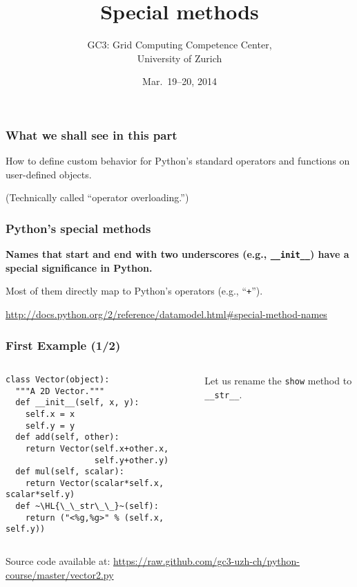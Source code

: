 \documentclass[english,serif,mathserif,xcolor=pdftex,dvipsnames,table]{beamer}
\title[Special methods]{%
  Special methods
}
\author[GC3]{%
  GC3: Grid Computing Competence Center, \\
  University of Zurich
}
\date{Mar.~19--20, 2014}
\begin{document}
\maketitle


\begin{frame}
  \frametitle{What we shall see in this part}

  How to define custom behavior for Python's standard operators and
  functions on user-defined objects.

  \+
  (Technically called ``operator overloading.'')
\end{frame}


\begin{frame}[fragile]
  \frametitle{Python's special methods}

  \textbf{Names that start and end with two underscores (e.g.,
    \lstinline|__init__|) have a special significance in Python.}

  \+ Most of them directly map to Python's operators (e.g.,
  ``\texttt{+}'').

  \+
  \begin{references}
    \url{http://docs.python.org/2/reference/datamodel.html#special-method-names}
  \end{references}
\end{frame}


\begin{frame}[fragile]
  \frametitle{First Example (1/2)}
  \begin{columns}[t]
    \begin{column}{0.5\textwidth}
\begin{lstlisting}
class Vector(object):
  """A 2D Vector."""
  def __init__(self, x, y):
    self.x = x
    self.y = y
  def add(self, other):
    return Vector(self.x+other.x,
                  self.y+other.y)
  def mul(self, scalar):
    return Vector(scalar*self.x, scalar*self.y)
  def ~\HL{\_\_str\_\_}~(self):
    return ("<%g,%g>" % (self.x, self.y))
\end{lstlisting}
    \end{column}
    \begin{column}{0.5\textwidth}
      \raggedleft
      Let us rename the \texttt{show} method to \texttt{\_\_str\_\_}.
    \end{column}
  \end{columns}

  \+
  {\scriptsize Source code available at:
    \url{https://raw.github.com/gc3-uzh-ch/python-course/master/vector2.py}}
\end{frame}
\end{document}
